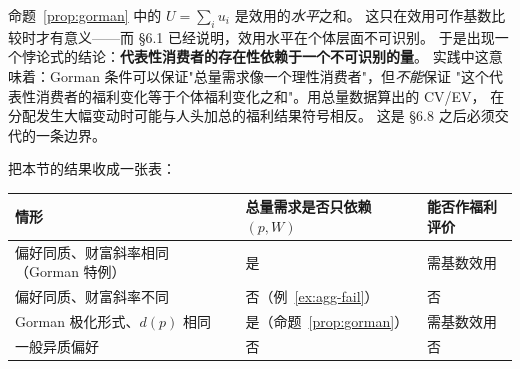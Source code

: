 \begin{remark}
命题~\ref{prop:gorman} 中的 $U=\sum_iu_i$ 是效用的\emph{水平}之和。
这只在效用可作基数比较时才有意义——而 \S 6.1 已经说明，效用水平在个体层面不可识别。
于是出现一个悖论式的结论：\textbf{代表性消费者的存在性依赖于一个不可识别的量}。
实践中这意味着：Gorman 条件可以保证"总量需求像一个理性消费者"，但\emph{不能}保证
"这个代表性消费者的福利变化等于个体福利变化之和"。用总量数据算出的 CV/EV，
在分配发生大幅变动时可能与人头加总的福利结果符号相反。
这是 \S 6.8 之后必须交代的一条边界。
\end{remark}

把本节的结果收成一张表：

\begin{center}
\small
\begin{tabular}{lll}
\toprule
情形 & 总量需求是否只依赖 $(p,W)$ & 能否作福利评价\\
\midrule
偏好同质、财富斜率相同（Gorman 特例） & 是 & 需基数效用\\
偏好同质、财富斜率不同 & 否（例~\ref{ex:agg-fail}） & 否\\
Gorman 极化形式、$d(p)$ 相同 & 是（命题~\ref{prop:gorman}） & 需基数效用\\
一般异质偏好 & 否 & 否\\
\bottomrule
\end{tabular}
\end{center}
